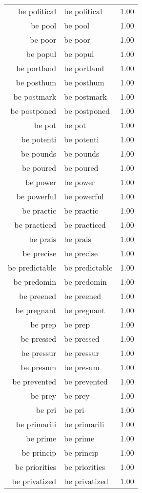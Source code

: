 \begin{table}[ht]
\begin{tabular}{rlr}
  be political & be political & 1.00 \\ 
  be pool & be pool & 1.00 \\ 
  be poor & be poor & 1.00 \\ 
  be popul & be popul & 1.00 \\ 
  be portland & be portland & 1.00 \\ 
  be posthum & be posthum & 1.00 \\ 
  be postmark & be postmark & 1.00 \\ 
  be postponed & be postponed & 1.00 \\ 
  be pot & be pot & 1.00 \\ 
  be potenti & be potenti & 1.00 \\ 
  be pounds & be pounds & 1.00 \\ 
  be poured & be poured & 1.00 \\ 
  be power & be power & 1.00 \\ 
  be powerful & be powerful & 1.00 \\ 
  be practic & be practic & 1.00 \\ 
  be practiced & be practiced & 1.00 \\ 
  be prais & be prais & 1.00 \\ 
  be precise & be precise & 1.00 \\ 
  be predictable & be predictable & 1.00 \\ 
  be predomin & be predomin & 1.00 \\ 
  be preened & be preened & 1.00 \\ 
  be pregnant & be pregnant & 1.00 \\ 
  be prep & be prep & 1.00 \\ 
  be pressed & be pressed & 1.00 \\ 
  be pressur & be pressur & 1.00 \\ 
  be presum & be presum & 1.00 \\ 
  be prevented & be prevented & 1.00 \\ 
  be prey & be prey & 1.00 \\ 
  be pri & be pri & 1.00 \\ 
  be primarili & be primarili & 1.00 \\ 
  be prime & be prime & 1.00 \\ 
  be princip & be princip & 1.00 \\ 
  be priorities & be priorities & 1.00 \\ 
  be privatized & be privatized & 1.00 \\ 

\end{tabular}
\end{table}
